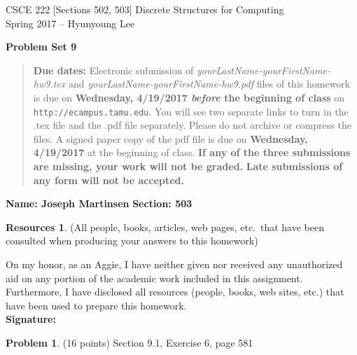 \documentclass{article}
\theoremstyle{definition}
\newtheorem{problem}{Problem}
\newtheorem*{resources}{Resources}
\newcommand{\name}[2]{\noindent\textbf{Name: #1}\hfill \textbf{Section: #2}}
\newcommand{\honor}{\noindent On my honor, as an Aggie, I have neither
  given nor received any unauthorized aid on any portion of the
  academic work included in this assignment. Furthermore, I have
  disclosed all resources (people, books, web sites, etc.) that have
  been used to prepare this homework. \\[2ex]
 \textbf{Signature:} \underline{\hspace*{8cm}} }
\newcommand{\problemset}[1]{\begin{center}\textbf{Problem Set #1}\end{center}}
\newcommand{\duedate}[2]{\begin{quote}\textbf{Due dates:} Electronic
    submission of \textsl{yourLastName-yourFirstName-hw9.tex} and 
    \textsl{yourLastName-yourFirstName-hw9.pdf} files of this homework is due on
    \textbf{#1} on \texttt{http://ecampus.tamu.edu}. You will see two separate links
    to turn in the .tex file and the .pdf file separately. Please do not archive or compress the files.  
    A signed paper copy of the pdf file is due on \textbf{#2} at the beginning of class.
    \textbf{If any of the three submissions are missing, your work will not be graded.}
    \textbf{Late submissions of any form will not be accepted.}\end{quote} }
\begin{document}
\vspace*{-18mm}
\begin{center}
{\large
CSCE 222 [Sections 502, 503] Discrete Structures for Computing\\[.5ex]
Spring 2017 -- Hyunyoung Lee\\}
\end{center}
\problemset{9}
\duedate{Wednesday, 4/19/2017 \textit{before} the beginning of class}{Wednesday, 4/19/2017}
\name{ Joseph Martinsen }{503}
\begin{resources} (All people, books, articles, web pages, etc.\ that
  have been consulted when producing your answers to this homework)
\end{resources}
\honor

\begin{problem} (16 points)
Section 9.1, Exercise 6, page 581
\end{problem}
\end{document}
